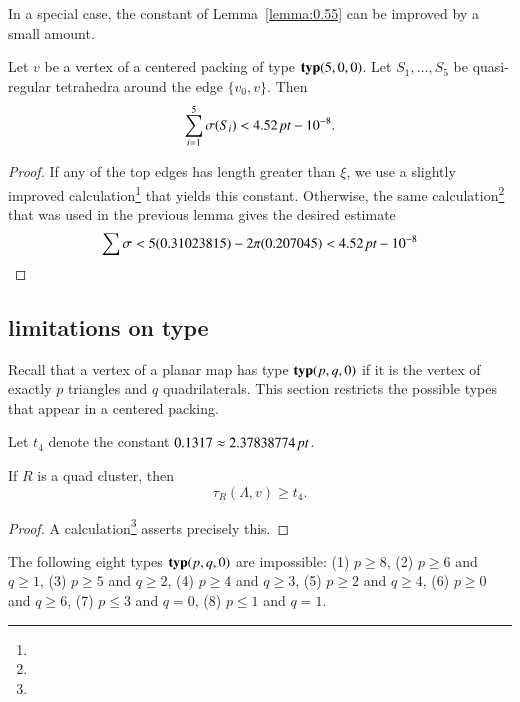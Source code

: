 In a special case, the constant of Lemma~\ref{lemma:0.55} can be
improved by a small amount.

\begin{lemma}
    \label{lemma:0.55A}
Let $v$ be a vertex of a centered packing of type ${\operatorname{\bf typ}}{(5,0,0)}$.  Let
$S_1,\ldots, S_5$ be quasi-regular tetrahedra around the edge
$\{v_0,v\}$. Then
    $$\sum_{i=1}^5 \sigma(S_i) < 4.52\,\hbox{\it pt} - 10^{-8}.$$
\end{lemma}

\begin{proof}
If any of the top edges has length greater than $\xi$, we use a
slightly improved calculation\footnote{} that
yields this constant. Otherwise, the same
calculation\footnote{} that was used in the previous
lemma gives the desired estimate
  $$
  \sum\sigma < 5(0.31023815) - 2\pi(0.207045) < 4.52\,\hbox{\it pt} - 10^{-8}
  $$
\end{proof}

\subsection{limitations on type}%

Recall that a vertex of a planar map has type ${\operatorname{\bf typ}}{(p,q,0)}$ if it is the
vertex of exactly $p$ triangles and $q$ quadrilaterals. This
section restricts the possible types that appear in a centered
packing.

Let $t_4$ denote the constant $0.1317\approx 2.37838774\,\hbox{\it pt}$.

\begin{lemma}\label{lemma:0.1317} If $R$ is a quad cluster, then
   $$\tau_R(\Lambda,v) \ge t_4.$$
\end{lemma}

\begin{proof}
A calculation\footnote{} asserts precisely this.
\end{proof}

\begin{lemma} \label{lemma:pq-impossible}
The following eight types ${\operatorname{\bf typ}}{(p,q,0)}$ are impossible:
    (1)  $p\ge 8$,
    (2)  $p\ge 6$ and $q\ge 1$,
    (3)  $p \ge 5$ and $q\ge 2$,
    (4)  $p \ge 4$ and $q\ge 3$,
    (5)  $p \ge 2$ and $q\ge 4$,
    (6)  $p \ge 0$ and $q\ge 6$,
    (7)  $p \le 3$ and $q=0$,
    (8) $p \le 1$ and $q=1$.
\end{lemma}

